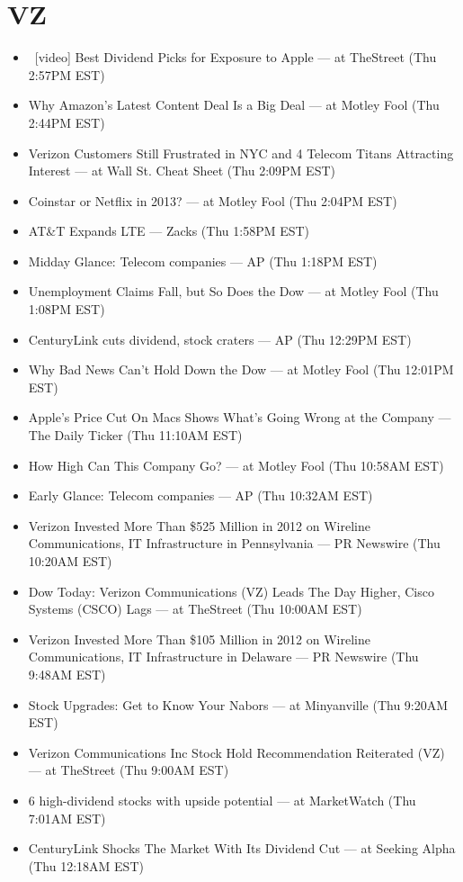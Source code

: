 \documentclass[11pt,asymmetric]{article}
\begin{document}
\section*{VZ}
\begin{itemize}
\item\ [video] Best Dividend Picks for Exposure to Apple --- at TheStreet (Thu 2:57PM EST)
\item Why Amazon's Latest Content Deal Is a Big Deal --- at Motley Fool (Thu 2:44PM EST)
\item Verizon Customers Still Frustrated in NYC and 4 Telecom Titans Attracting Interest --- at Wall St. Cheat Sheet (Thu 2:09PM EST)
\item Coinstar or Netflix in 2013? --- at Motley Fool (Thu 2:04PM EST)
\item AT\&T Expands LTE --- Zacks (Thu 1:58PM EST)
\item Midday Glance: Telecom companies --- AP (Thu 1:18PM EST)
\item Unemployment Claims Fall, but So Does the Dow --- at Motley Fool (Thu 1:08PM EST)
\item CenturyLink cuts dividend, stock craters --- AP (Thu 12:29PM EST)
\item Why Bad News Can't Hold Down the Dow --- at Motley Fool (Thu 12:01PM EST)
\item Apple’s Price Cut On Macs Shows What’s Going Wrong at the Company --- The Daily Ticker (Thu 11:10AM EST)
\item How High Can This Company Go? --- at Motley Fool (Thu 10:58AM EST)
\item Early Glance: Telecom companies --- AP (Thu 10:32AM EST)
\item Verizon Invested More Than \$525 Million in 2012 on Wireline Communications, IT Infrastructure in Pennsylvania --- PR Newswire (Thu 10:20AM EST)
\item Dow Today: Verizon Communications (VZ) Leads The Day Higher, Cisco Systems (CSCO) Lags --- at TheStreet (Thu 10:00AM EST)
\item Verizon Invested More Than \$105 Million in 2012 on Wireline Communications, IT Infrastructure in Delaware --- PR Newswire (Thu 9:48AM EST)
\item Stock Upgrades: Get to Know Your Nabors --- at Minyanville (Thu 9:20AM EST)
\item Verizon Communications Inc Stock Hold Recommendation Reiterated (VZ) --- at TheStreet (Thu 9:00AM EST)
\item 6 high-dividend stocks with upside potential --- at MarketWatch (Thu 7:01AM EST)
\item CenturyLink Shocks The Market With Its Dividend Cut --- at Seeking Alpha (Thu 12:18AM EST)
\end{itemize}
\end{document}
